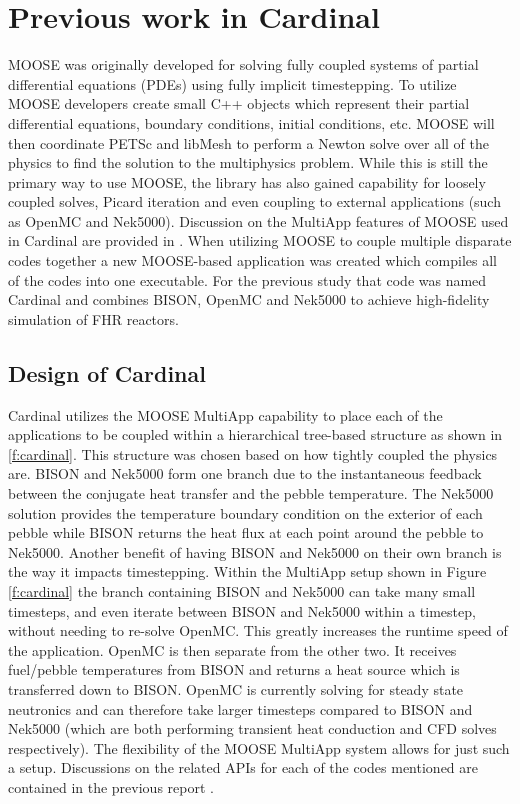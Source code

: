 \section{Previous work in Cardinal}
\label{s:cardinal}

MOOSE was originally developed for solving fully coupled systems of partial differential equations (PDEs) using fully implicit timestepping. To utilize MOOSE developers create small C++ objects which represent their partial differential equations, boundary conditions, initial conditions, etc. MOOSE will then coordinate PETSc and libMesh to perform a Newton solve over all of the physics to find the solution to the multiphysics problem. While this is still the primary way to use MOOSE, the library has also gained capability for loosely coupled solves, Picard iteration and even coupling to external applications (such as OpenMC and Nek5000). Discussion on the MultiApp features of MOOSE used in Cardinal are provided in \cite{cardinal}. When utilizing MOOSE to couple multiple disparate codes together a new MOOSE-based application was created \cite{cardinal}  which compiles all of the codes into one executable. For the previous study that code was  named Cardinal and combines BISON, OpenMC and Nek5000 to achieve high-fidelity simulation of FHR reactors.

\subsection{Design of Cardinal}
\label{ss:c1}

Cardinal utilizes the MOOSE MultiApp capability to place each of the applications to be coupled within a hierarchical tree-based structure as shown in \ref{f:cardinal}. This structure was chosen based on how tightly coupled the physics are. BISON and Nek5000 form one branch due to the instantaneous feedback between the conjugate heat transfer and the pebble temperature. The Nek5000 solution provides the temperature boundary condition on the exterior of each pebble while BISON returns the heat  flux at each point around the pebble to Nek5000. Another benefit of having BISON and Nek5000 on their own branch is the way it impacts timestepping. Within the MultiApp setup shown in Figure \ref{f:cardinal} the branch containing BISON and Nek5000 can take many small timesteps, and even iterate between BISON and Nek5000 within a timestep, without needing to re-solve OpenMC. This greatly increases the runtime speed of the application. OpenMC is then separate from the other two. It receives fuel/pebble temperatures from BISON and returns a heat source which is transferred down to BISON. OpenMC is currently solving for steady state neutronics and can therefore take larger timesteps compared to BISON and Nek5000 (which are both performing transient heat conduction and CFD solves respectively). The flexibility of the MOOSE MultiApp system allows for just such a setup. Discussions on the related APIs for each of the codes mentioned are contained in the previous report \cite{cardinal}.

